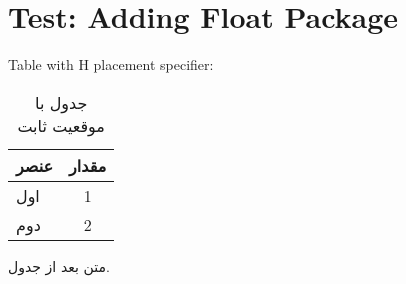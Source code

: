 \documentclass[12pt,a4paper]{article}
\newcommand{\fa}[1]{\textfarsi{#1}}
\newcommand{\en}[1]{\textenglish{#1}}
\begin{document}
\section*{Test: Adding Float Package}

\en{Table with H placement specifier:}

\begin{table}[H]
\centering
\begin{tabular}{lc}
\toprule
\fa{عنصر} & \fa{مقدار} \\
\midrule
\fa{اول} & 1 \\
\fa{دوم} & 2 \\
\bottomrule
\end{tabular}
\caption{\fa{جدول با موقعیت ثابت}}
\end{table}

\fa{متن بعد از جدول.}
\end{document}
